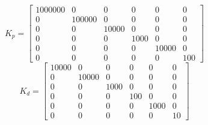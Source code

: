 \documentclass[a4paper]{article}
\begin{document}
\begin{equation}
K_p = 
\begin{bmatrix}
1000000 & 0 & 0	& 0 & 0 & 0 \\
0 & 100000 & 0 & 0 & 0 & 0 \\
0 & 0 & 10000 & 0 & 0 & 0 \\
0 & 0 & 0 & 1000 & 0 & 0 \\
0 & 0 & 0 & 0 & 10000 & 0 \\
0 & 0 & 0 & 0 & 0 & 100
\end{bmatrix}
\end{equation}
\begin{equation}
K_d = 
\begin{bmatrix}
10000 & 0 & 0	& 0 & 0 & 0 \\
0 & 10000 & 0 & 0 & 0 & 0 \\
0 & 0 & 1000 & 0 & 0 & 0 \\
0 & 0 & 0 & 100 & 0 & 0 \\
0 & 0 & 0 & 0 & 1000 & 0 \\
0 & 0 & 0 & 0 & 0 & 10
\end{bmatrix}
\end{equation}
\end{document}
